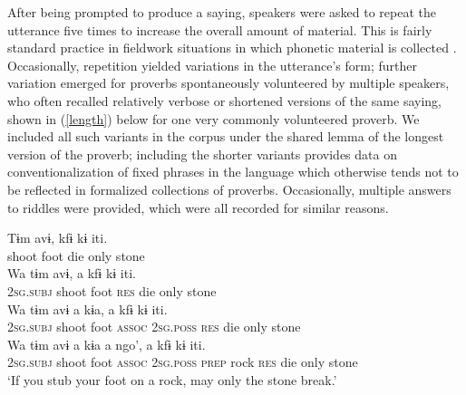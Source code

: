 \documentclass[output=paper,colorlinks,citecolor=brown
]{langscibook}
\begin{document}
After being prompted to produce a saying, speakers were asked to repeat the utterance five times to increase the overall amount of material. This is fairly standard practice in fieldwork situations in which phonetic material is collected \citep{ladefoged2003phonetic}. 
Occasionally, repetition yielded variations in the utterance's form; further variation emerged for proverbs spontaneously volunteered by multiple speakers, who often recalled relatively verbose or shortened versions of the same saying, shown in (\ref{length}) below for one very commonly volunteered proverb. 
We included all such variants in the corpus under the shared lemma of the longest version of the proverb; including the shorter variants provides data on conventionalization of fixed phrases in the language which otherwise tends not to be reflected in formalized collections of proverbs.
Occasionally, multiple answers to riddles were provided, which were all recorded for similar reasons. 

\ea \label{length}
\begin{xlist}

\ex 
\gll Tɨm avɨ, kfɨ kɨ iti.\\
shoot foot die only stone \\

\ex
\gll Wa tɨm avɨ, a kfɨ kɨ iti.\\
\textsc{2sg.subj} shoot foot \textsc{res} die only stone \\

\ex 
\gll Wa tɨm avɨ a kɨa, a kfɨ kɨ iti.\\
\textsc{2sg.subj} shoot foot \textsc{assoc} \textsc{2sg.poss} \textsc{res} die only stone \\

\ex
\gll Wa tɨm avɨ a kɨa a ngo', a kfɨ kɨ iti.\\
\textsc{2sg.subj} shoot foot \textsc{assoc} \textsc{2sg.poss} \textsc{prep} rock \textsc{res} die only stone \\
\glt `If you stub your foot on a rock, may only the stone break.'  
\end{xlist}
\z 
\end{document}
